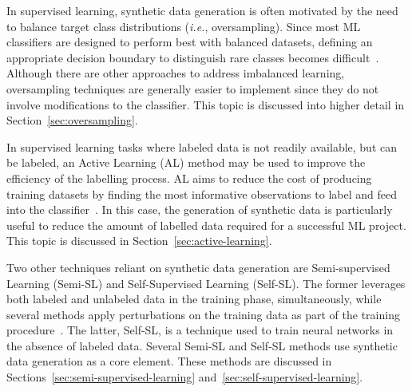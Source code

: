 \documentclass[parskip=full]{scrartcl}
\begin{document}
In supervised learning, synthetic data generation is often motivated by the
need to balance target class distributions (\textit{i.e.}, oversampling).
Since most ML classifiers are designed to perform best with balanced datasets,
defining an appropriate decision boundary to distinguish rare classes becomes
difficult~\cite{saez2016analyzing}. Although there are other approaches to
address imbalanced learning, oversampling techniques are generally easier to
implement since they do not involve modifications to the classifier. This
topic is discussed into higher detail in Section~\ref{sec:oversampling}.

In supervised learning tasks where labeled data is not readily available, but
can be labeled, an Active Learning (AL) method may be used to improve the
efficiency of the labelling process. AL aims to reduce the cost of producing
training datasets by finding the most informative observations to label and
feed into the classifier~\cite{fonseca2021increasing}. In this case, the
generation of synthetic data is particularly useful to reduce the amount of
labelled data required for a successful ML project. This topic is discussed in
Section~\ref{sec:active-learning}.

Two other techniques reliant on synthetic data generation are Semi-supervised
Learning (Semi-SL) and Self-Supervised Learning (Self-SL). The former
leverages both labeled and unlabeled data in the training phase,
simultaneously, while several methods apply perturbations on the training data
as part of the training procedure~\cite{van2020survey}. The latter, Self-SL,
is a technique used to train neural networks in the absence of labeled data.
Several Semi-SL and Self-SL methods use synthetic data generation as a core
element. These methods are discussed in
Sections~\ref{sec:semi-supervised-learning}
and~\ref{sec:self-supervised-learning}.



 
 
\end{document}
